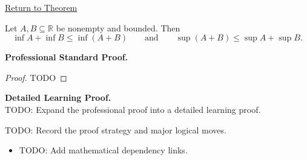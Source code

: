 \newpage
{}
\label{prf:bounds-sum-set}

\begin{remark*}[Return]
\hyperref[prop:bounds-sum-set]{Return to Theorem}
\end{remark*}

\begin{theorem*}
Let $A,B\subseteq\mathbb{R}$ be nonempty and bounded. Then
\[
  \inf A+\inf B\le \inf(A+B)
  \qquad\text{and}\qquad
  \sup(A+B)\le \sup A+\sup B.
\]
\end{theorem*}

\textbf{Professional Standard Proof.}~\\
\begin{proof}
TODO
\end{proof}

\textbf{Detailed Learning Proof.}~\\
TODO: Expand the professional proof into a detailed learning proof.

\begin{remark*}
TODO: Record the proof strategy and major logical moves.
\end{remark*}

\begin{dependencies}
\begin{itemize}
  \item TODO: Add mathematical dependency links.
\end{itemize}
\end{dependencies}
